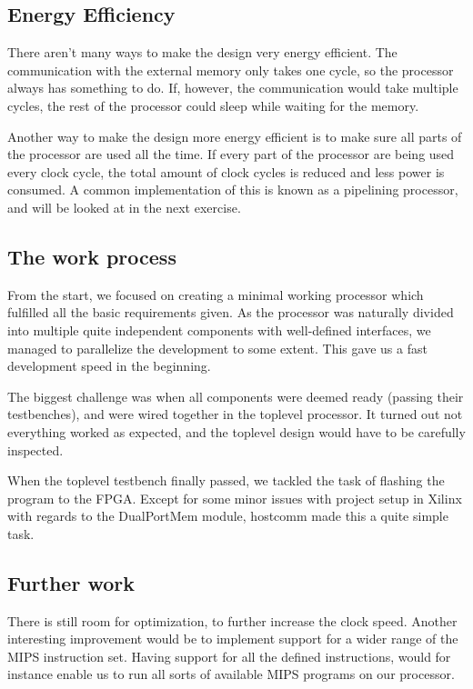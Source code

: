 \subsection{Energy Efficiency}
There aren't many ways to make the design very energy efficient.
The communication with the external memory only takes one cycle, so the processor always has something to do.
If, however, the communication would take multiple cycles, the rest of the processor could sleep while waiting for the memory.

Another way to make the design more energy efficient is to make sure all parts of the processor are used all the time.
If every part of the processor are being used every clock cycle,
the total amount of clock cycles is reduced and less power is consumed.
A common implementation of this is known as a pipelining processor, and will be looked at in the next exercise.

\subsection{The work process}

From the start, we focused on creating a minimal working processor which fulfilled all the basic requirements given.
As the processor was naturally divided into multiple quite independent components with well-defined interfaces, we managed to parallelize the development to some extent.
This gave us a fast development speed in the beginning.

The biggest challenge was when all components were deemed ready (passing their testbenches), and were wired together in the toplevel processor.
It turned out not everything worked as expected, and the toplevel design would have to be carefully inspected.

When the toplevel testbench finally passed, we tackled the task of flashing the program to the FPGA.
Except for some minor issues with project setup in Xilinx with regards to the DualPortMem module, hostcomm made this a quite simple task.

\subsection{Further work}

There is still room for optimization, to further increase the clock speed.
Another interesting improvement would be to implement support for a wider range of the MIPS instruction set.
Having support for all the defined instructions, would for instance enable us to run all sorts of available MIPS programs on our processor.
